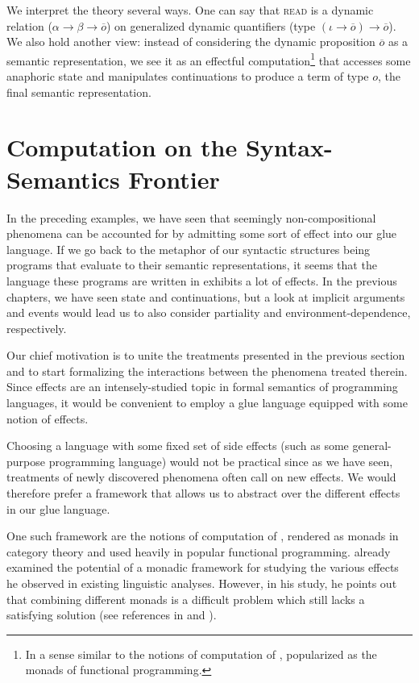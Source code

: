 \documentclass[a4paper,11pt]{easychair}
\begin{document}
We interpret the theory several ways. One can say that \textsc{read} is a
dynamic relation ($\alpha \to \beta \to \overline{o}$) on generalized dynamic
quantifiers (type $(\iota \to \overline{o}) \to \overline{o}$). We also hold
another view: instead of considering the dynamic proposition $\overline{o}$ as
a semantic representation, we see it as an effectful computation\footnote{In a
  sense similar to the notions of computation of \citet{moggi1991notions},
  popularized as the monads of functional programming.} that accesses some
anaphoric state and manipulates continuations to produce a term of type $o$,
the final semantic representation.


\section{Computation on the Syntax-Semantics Frontier}

In the preceding examples, we have seen that seemingly non-compositional
phenomena can be accounted for by admitting some sort of effect into our glue
language. If we go back to the metaphor of our syntactic structures being
programs that evaluate to their semantic representations, it seems that the
language these programs are written in exhibits a lot of effects. In the
previous chapters, we have seen state and continuations, but a look at
implicit arguments and events would lead us to also consider partiality and
environment-dependence, respectively.

Our chief motivation is to unite the treatments presented in the previous
section and to start formalizing the interactions between the phenomena
treated therein. Since effects are an intensely-studied topic in formal
semantics of programming languages, it would be convenient to employ a glue
language equipped with some notion of effects.

Choosing a language with some fixed set of side effects (such as some
general-purpose programming language) would not be practical since as we have
seen, treatments of newly discovered phenomena often call on new effects. We
would therefore prefer a framework that allows us to abstract over the
different effects in our glue language.

One such framework are the notions of computation of
\citet{moggi1991notions}, rendered as monads in category theory and used
heavily in popular functional programming. \citet{shan2002monads} already
examined the potential of a monadic framework for studying the various effects
he observed in existing linguistic analyses. However, in his study, he points
out that combining different monads is a difficult problem which still lacks a
satisfying solution (see references in \cite{shan2002monads} and
\citet{kammar2013handlers}).
\end{document}
